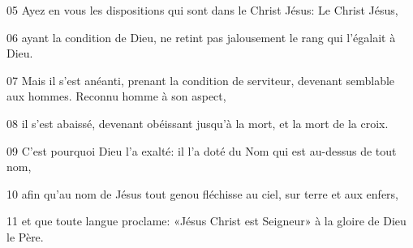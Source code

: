 05 Ayez en vous les dispositions qui sont dans le Christ Jésus: Le Christ Jésus,

06 ayant la condition de Dieu, ne retint pas jalousement le rang qui l’égalait à Dieu.

07 Mais il s’est anéanti, prenant la condition de serviteur, devenant semblable aux hommes. Reconnu homme à son aspect,

08 il s’est abaissé, devenant obéissant jusqu’à la mort, et la mort de la croix.

09 C’est pourquoi Dieu l’a exalté: il l’a doté du Nom qui est au-dessus de tout nom,

10 afin qu’au nom de Jésus tout genou fléchisse au ciel, sur terre et aux enfers,

11 et que toute langue proclame: «Jésus Christ est Seigneur» à la gloire de Dieu le Père.